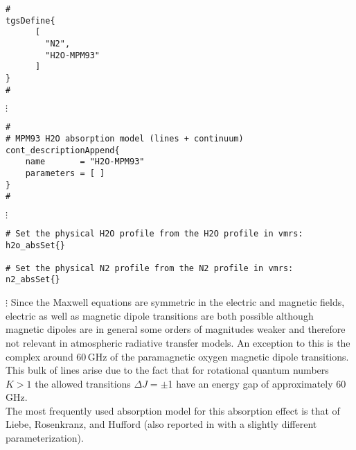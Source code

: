 \begin{verbatim}
#
tgsDefine{
      [ 
        "N2",
        "H2O-MPM93"
      ] 
}
#
\end{verbatim}
$\vdots$
\begin{verbatim}
#
# MPM93 H2O absorption model (lines + continuum)
cont_descriptionAppend{
    name       = "H2O-MPM93"
    parameters = [ ]
}
#
\end{verbatim}
$\vdots$
\begin{verbatim}
# Set the physical H2O profile from the H2O profile in vmrs:
h2o_absSet{}

# Set the physical N2 profile from the N2 profile in vmrs:
n2_absSet{}
\end{verbatim}
$\vdots$
%
%
%
%
\label{levelc:02_models}
%
Since the Maxwell equations are symmetric in the electric and
magnetic fields, electric as well as magnetic dipole transitions 
are both possible although magnetic dipoles are in general some
orders of magnitudes weaker and therefore not relevant in
atmospheric radiative transfer models. An exception to this is the complex 
around 60\,GHz of the paramagnetic oxygen magnetic dipole transitions. 
This bulk of lines arise due to the fact that for rotational 
quantum numbers $K>1$ the allowed transitions \mbox{$\Delta J = \pm$1} 
have an energy gap of approximately 60\,GHz.\\
The most frequently used absorption model for this absorption effect is that of
Liebe, Rosenkranz, and Hufford \cite{liebeetal:92} (also reported in 
\cite{pwr:93} with a slightly different parameterization).

